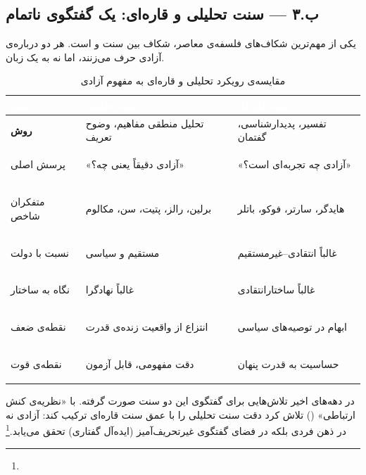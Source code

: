 \subsection{ب.۳ — سنت تحلیلی و قاره‌ای: یک گفتگوی ناتمام}
\label{subsec:analytic_continental}

یکی از مهم‌ترین شکاف‌های فلسفه‌ی معاصر، شکاف بین سنت  و  است. هر دو درباره‌ی آزادی حرف می‌زنند، اما نه به یک زبان.

\begin{table}[h!]
\centering
\caption{مقایسه‌ی رویکرد تحلیلی و قاره‌ای به مفهوم آزادی}
\label{tab:analytic_continental}
\renewcommand{\arraystretch}{1.6}

\begin{tabularx}{\textwidth}{|>{\bfseries}p{2.8cm}
  |>{\raggedright}X|>{\raggedright\arraybackslash}X|}
\hline
\rowcolor{PrimaryDeep}
\textcolor{white}{\textbf{معیار}} &
\textcolor{white}{\textbf{سنت تحلیلی}} &
\textcolor{white}{\textbf{سنت قاره‌ای}} \\
\hline

\rowcolor{BgCool}
روش & تحلیل منطقی مفاهیم، وضوح تعریف & تفسیر، پدیدارشناسی، گفتمان \\
\hline

\rowcolor{white}
پرسش اصلی & «آزادی دقیقاً یعنی چه؟» & «آزادی چه تجربه‌ای است؟» \\
\hline

\rowcolor{BgCool}
متفکران شاخص & برلین، رالز، پتیت، سن، مکالوم & هایدگر، سارتر، فوکو، باتلر \\
\hline

\rowcolor{white}
نسبت با دولت & مستقیم و سیاسی & غالباً انتقادی–غیرمستقیم \\
\hline

\rowcolor{BgCool}
نگاه به ساختار & غالباً نهادگرا & غالباً ساختارانتقادی \\
\hline

\rowcolor{white}
نقطه‌ی ضعف & انتزاع از واقعیت زنده‌ی قدرت & ابهام در توصیه‌های سیاسی \\
\hline

\rowcolor{BgCool}
نقطه‌ی قوت & دقت مفهومی، قابل آزمون & حساسیت به قدرت پنهان \\
\hline

\end{tabularx}
\end{table}

در دهه‌های اخیر تلاش‌هایی برای گفتگوی این دو سنت صورت گرفته.  با «نظریه‌ی کنش ارتباطی» () تلاش کرد دقت سنت تحلیلی را با عمق سنت قاره‌ای ترکیب کند: آزادی نه در ذهن فردی بلکه در فضای گفتگوی غیرتحریف‌آمیز (ایده‌آل گفتاری) تحقق می‌یابد.\footnote{} %


